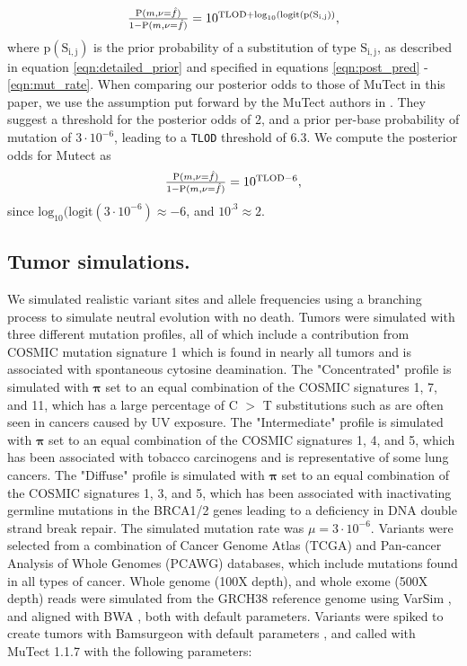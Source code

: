 \documentclass[a4,center,fleqn]{NAR}
\begin{document}
\begin{equation}
  \label{eqn:computed_posterior}
  $$
  \frac{\mathrm{P}(m,\nu = \hat{f})}{1 - \mathrm{P}(m,\nu = \hat{f})} = 10^{\mathrm{TLOD} + \mathrm{log}_{10}(\mathrm{logit}(\mathrm{p}(\mathrm{S_{i,j}}))},
  $$
\end{equation}
where $\mathrm{p}(\mathrm{S_{i,j}})$ is the prior probability of a substitution of type $\mathrm{S_{i,j}}$, as described in equation \ref{eqn:detailed_prior} and specified in equations \ref{eqn:post_pred} - \ref{eqn:mut_rate}.
When comparing our posterior odds to those of MuTect in this paper, we use the assumption put forward by the MuTect authors in \citet{Cibulskis2013}.
They suggest a threshold for the posterior odds of 2, and a prior per-base probability of mutation of $3\cdot10^{-6}$, leading to a \texttt{TLOD} threshold of 6.3.
We compute the posterior odds for Mutect as
\begin{equation}
  \label{eqn:mutect_posterior}
  $$
  \frac{\mathrm{P}(m,\nu = \hat{f})}{1 - \mathrm{P}(m,\nu = \hat{f})} = 10^{\mathrm{TLOD} - 6},
  $$
\end{equation}
since $\mathrm{log}_{10}(\mathrm{logit}(3\cdot10^{-6}) \approx -6$, and $10^{.3} \approx 2$.

\subsection{Tumor simulations.}
We simulated realistic variant sites and allele frequencies using a branching process to simulate neutral evolution with no death.
Tumors were simulated with three different mutation profiles, all of which include a contribution from COSMIC mutation signature 1 which is found in nearly all tumors and is associated with spontaneous cytosine deamination.
The "Concentrated" profile is simulated with $\mathbf{\pi}$ set to an equal combination of the COSMIC signatures 1, 7, and 11, which has a large percentage of C $>$ T substitutions such as are often seen in cancers caused by UV exposure.
The "Intermediate" profile is simulated with $\mathbf{\pi}$ set to an equal combination of the COSMIC signatures 1, 4, and 5, which has been associated with tobacco carcinogens and is representative of some lung cancers.
The "Diffuse" profile is simulated with $\mathbf{\pi}$ set to an equal combination of the COSMIC signatures 1, 3, and 5, which has been associated with inactivating germline mutations in the BRCA1/2 genes leading to a deficiency in DNA double strand break repair.
The simulated mutation rate was $\mu = 3\cdot10^{-6}$.
Variants were selected from a combination of Cancer Genome Atlas (TCGA) and Pan-cancer Analysis of Whole Genomes (PCAWG) databases, which include mutations found in all types of cancer.
Whole genome (100X depth), and whole exome (500X depth) reads were simulated from the GRCH38 reference genome using VarSim \cite{Mu2015}, and aligned with BWA \cite{Li2009a}, both with default parameters.
Variants were spiked to create tumors with Bamsurgeon with default parameters \cite{Ewing2015a},
and called with MuTect 1.1.7 \cite{Cibulskis2013} with the following parameters:
\end{document}
